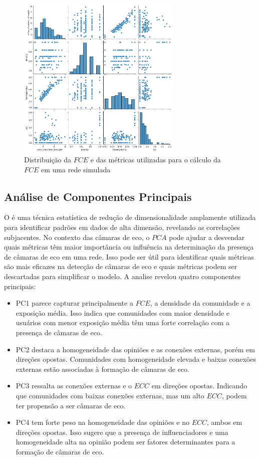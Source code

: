 \begin{figure}[htb]
	\centering
	\includegraphics[width=0.7\textwidth]{images/echo_chamber_strength_pairplot.png}
	\caption{Distribuição da $FCE$ e das métricas utilizadas para o cálculo da $FCE$ em uma rede simulada}
	\label{fig:echo_chamber_strength_pairplot}
\end{figure}

\subsection{Análise de Componentes Principais}

O  é uma técnica estatística de redução de dimensionalidade amplamente utilizada para identificar padrões em dados de alta dimensão, revelando as correlações subjacentes. No contexto das câmaras de eco, o $PCA$ pode ajudar a desvendar quais métricas têm maior importância ou influência na determinação da presença de câmaras de eco em uma rede. Isso pode ser útil para identificar quais métricas são mais eficazes na detecção de câmaras de eco e quais métricas podem ser descartadas para simplificar o modelo. A analise revelou quatro componentes principais:

\begin{itemize}
	\item PC1 parece capturar principalmente a $FCE$, a densidade da comunidade e a exposição média. Isso indica que comunidades com maior densidade e usuários com menor exposição média têm uma forte correlação com a presença de câmaras de eco.
	\item PC2 destaca a homogeneidade das opiniões e as conexões externas, porém em direções opostas. Comunidades com homogeneidade elevada e baixas conexões externas estão associadas à formação de câmaras de eco.
	\item PC3 ressalta as conexões externas e o $ECC$ em direções opostas. Indicando que comunidades com baixas conexões externas, mas um alto $ECC$, podem ter propensão a ser câmaras de eco.
	\item PC4 tem forte peso na homogeneidade das opiniões e no $ECC$, ambos em direções opostas. Isso sugere que a presença de influenciadores e uma homogeneidade alta na opinião podem ser fatores determinantes para a formação de câmaras de eco.
\end{itemize}


